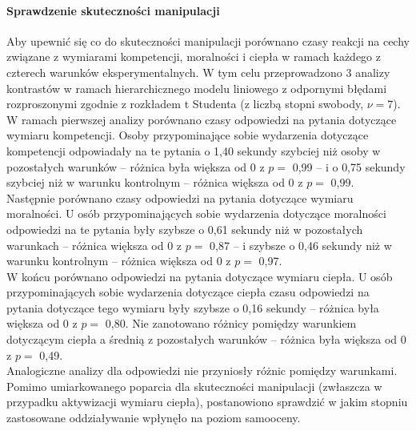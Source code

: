 \documentclass[man]{apa6}
\begin{document}
\paragraph{Sprawdzenie skuteczności manipulacji}
Aby upewnić się co do skuteczności manipulacji porównano czasy reakcji na cechy związane z wymiarami kompetencji, moralności i ciepła w ramach każdego z czterech warunków eksperymentalnych. W tym celu przeprowadzono 3 analizy kontrastów w ramach hierarchicznego modelu liniowego \parencite[odpowiednika  klasycznej jednoczynnikowej analizy wariancji, za:,][]{kruschke2014doing} z odpornymi błędami rozproszonymi zgodnie z rozkładem t Studenta (z liczbą stopni swobody, $\nu = 7$).\\
W ramach pierwszej analizy porównano czasy odpowiedzi na pytania dotyczące wymiaru kompetencji. Osoby przypominające sobie wydarzenia dotyczące kompetencji odpowiadały na te pytania o 1,40 sekundy szybciej niż osoby w pozostałych warunków -- różnica była większa od 0 z $p =$ 0,99 -- i o 0,75 sekundy szybciej niż w warunku kontrolnym -- różnica większa od 0 z $p =$ 0,99.\\
Następnie porównano czasy odpowiedzi na pytania dotyczące wymiaru moralności. U osób przypominających sobie wydarzenia dotyczące moralności odpowiedzi na te pytania były szybsze o 0,61 sekundy niż w pozostałych warunkach -- różnica większa od 0 z $p =$ 0,87 -- i szybsze o 0,46 sekundy niż w warunku kontrolnym -- różnica większa od 0 z $p =$ 0,97. \\
W końcu porównano odpowiedzi na pytania dotyczące wymiaru ciepła. U osób przypominających sobie wydarzenia dotyczące ciepła czasu odpowiedzi na pytania dotyczące tego wymiaru były szybsze o 0,16 sekundy -- różnica była większa od 0 z $p =$ 0,80. Nie zanotowano różnicy pomiędzy warunkiem dotyczącym ciepła a średnią z pozostałych warunków -- różnica była większa od 0 z $p =$ 0,49.\\
Analogiczne analizy dla odpowiedzi nie przyniosły różnic pomiędzy warunkami. Pomimo umiarkowanego poparcia dla skuteczności manipulacji (zwłaszcza w przypadku aktywizacji wymiaru ciepła), postanowiono sprawdzić w jakim stopniu zastosowane oddziaływanie wpłynęło na poziom samooceny.\\
\end{document}
